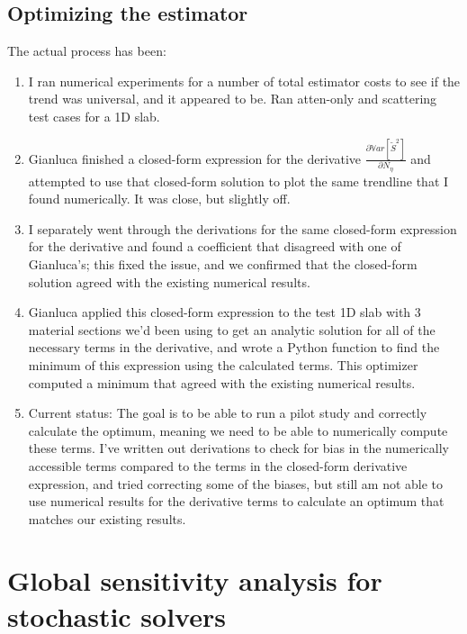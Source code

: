 \subsection{Optimizing the estimator}
The actual process has been:
\begin{enumerate}
    \item I ran numerical experiments for a number of total estimator costs to see if the trend was universal, and it appeared to be. Ran atten-only and scattering test cases for a 1D slab. 
    \item Gianluca finished a closed-form expression for the derivative $\frac{\partial \mathbb{V}ar[\tilde{S}^2]}{\partial N_\eta}$ and attempted to use that closed-form solution to plot the same trendline that I found numerically. It was close, but slightly off. 
    \item I separately went through the derivations for the same closed-form expression for the derivative and found a coefficient that disagreed with one of Gianluca's; this fixed the issue, and we confirmed that the closed-form solution agreed with the existing numerical results. 
    \item Gianluca applied this closed-form expression to the test 1D slab with 3 material sections we'd been using to get an analytic solution for all of the necessary terms in the derivative, and wrote a Python function to find the minimum of this expression using the calculated terms. This optimizer computed a minimum that agreed with the existing numerical results. 
    \item Current status: The goal is to be able to run a pilot study and correctly calculate the optimum, meaning we need to be able to numerically compute these terms. I've written out derivations to check for bias in the numerically accessible terms compared to the terms in the closed-form derivative expression, and tried correcting some of the biases, but still am not able to use numerical results for the derivative terms to calculate an optimum that matches our existing results. 
    \end{enumerate}


\section{Global sensitivity analysis for stochastic solvers}
